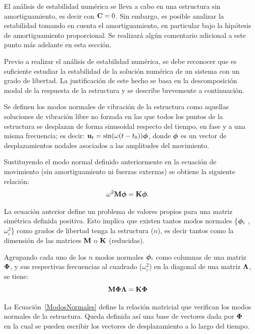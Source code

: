 El análisis de estabilidad numérica se lleva a cabo en una estructura sin amortiguamiento, es decir con ${\bf C} = 0$. Sin embargo, es posible analizar la estabilidad tomando en cuenta el amortiguamiento, en particular bajo la hipótesis de amortiguamiento proporcional. %
%
Se realizará algún comentario adicional a este punto más adelante en esta sección.

Previo a realizar el análisis de estabilidad numérica, se debe reconocer que es suficiente estudiar la estabilidad de la solución numérica de un sistema con un grado de libertad. %
%
La justificación de este hecho se basa en la descomposición modal de la respuesta de la estructura y se describe brevemente a continuación.

Se definen los modos normales de vibración de la estructura como aquellas soluciones de vibración libre no forzada en las que todos los puntos de la estructura se desplazan de forma sinusoidal respecto del tiempo, en fase y a una misma frecuencia; es decir: ${\bf u}_t = \sin(\omega(t-t_0)) \boldsymbol{\phi} $, donde $\boldsymbol{\phi}$ es un vector de desplazamientos nodales asociados a las amplitudes del movimiento.

Sustituyendo el modo normal definido anteriormente en la ecuación de movimiento (sin amortiguamiento ni fuerzas externas) se obtiene la siguiente relación:
%
\begin{equation}
	\omega^2 {\bf M} \boldsymbol{\phi} = {\bf K} \boldsymbol{\phi}.
\end{equation}

La ecuación anterior define un problema de valores propios para una matriz simétrica definida positiva. Esto implica que existen tantos modos normales \{$\boldsymbol{\phi}_i$ , $\omega_i^2$\} como grados de libertad tenga la estructura ($n$), es decir tantos como la dimensión de las matrices ${\bf M}$ o ${\bf K}$ (reducidas). %


Agrupando cada uno de los $n$ modos normales $\boldsymbol{\phi}_i$ como columnas de una matriz $\boldsymbol{\Phi}$, y sus respectivas frecuencias al cuadrado ($\omega_i^2$) en la diagonal de una matriz $\boldsymbol{\Lambda}$, se tiene:
%
\begin{equation}\label{ModosNormales}
{\bf M} \boldsymbol{\Phi} \boldsymbol{\Lambda} = {\bf K} \boldsymbol{\Phi}
\end{equation}

La Ecuación~\eqref{ModosNormales} define la relación matricial que verifican los modos normales de la estructura. Queda definida así una base de vectores dada por $\boldsymbol{\Phi}$ en la cual se pueden escribir los vectores de desplazamiento a lo largo del tiempo.

